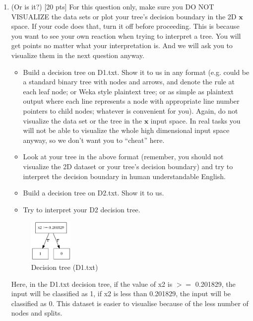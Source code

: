 \documentclass[a4paper]{article}
\theoremstyle{definition}
\def\x{\mathbf x}
\newenvironment{soln}{
    \leavevmode\color{blue}\ignorespaces
}{}
\begin{document}
\begin{enumerate}
\item (Or is it?)  [20 pts] For this question only, make sure you DO NOT VISUALIZE the data sets or plot your tree's decision boundary in the 2D $\x$ space.  If your code does that, turn it off before proceeding.  This is because you want to see your own reaction when trying to interpret a tree.  You will get points no matter what your interpretation is.
And we will ask you to visualize them in the next question anyway.
  \begin{itemize}
  \item Build a decision tree on D1.txt.  Show it to us in any format (e.g. could be a standard binary tree with nodes and arrows, and denote the rule at each leaf node; or Weka style plaintext tree; or as simple as plaintext output where each line represents a node with appropriate line number pointers to child nodes; whatever is convenient for you). Again, do not visualize the data set or the tree in the $\x$ input space.  In real tasks you will not be able to visualize the whole high dimensional input space anyway, so we don't want you to ``cheat'' here.
  \item Look at your tree in the above format (remember, you should not visualize the 2D dataset or your tree's decision boundary) and try to interpret the decision boundary in human understandable English. 
  \item Build a decision tree on D2.txt.  Show it to us.
  \item Try to interpret your D2 decision tree.
  \end{itemize}

\begin{soln}
	\begin{figure}[h!]
	        \centering
	        \includegraphics[width=0.2\textwidth]{D1.png} 
	        \captionsetup{labelformat=empty}
	        \caption{Decision tree (D1.txt)}
	        \label{fig:Decision tree (D1.txt)}
	   \end{figure}

	Here, in the D1.txt decision tree, if the value of x2 is $>=$ 0.201829, the input will be classified as 1, if x2 is less than 0.201829, the input will be classified as 0. This dataset is easier to visualise because of the less number of nodes and splits.


\end{soln}
\end{enumerate}
\end{document}
